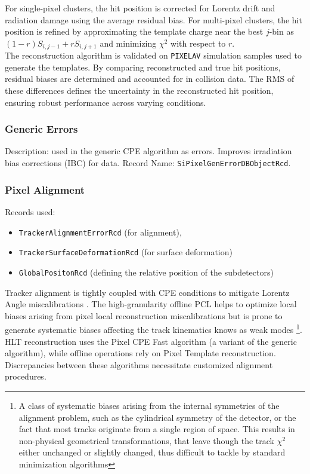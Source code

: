 For single-pixel clusters, the hit position is corrected for Lorentz drift and radiation damage using the average residual bias. For multi-pixel clusters, the hit position is refined by approximating the template charge near the best \(j\)-bin as \((1-r)S_{i,j-1} + rS_{i,j+1}\) and minimizing \(\chi^2\) with respect to \(r\).\\
The reconstruction algorithm is validated on \texttt{PIXELAV} simulation \cite{Swartz:687440} samples used to generate the templates. By comparing reconstructed and true hit positions, residual biases are determined and accounted for in collision data. The RMS of these differences defines the uncertainty in the reconstructed hit position, ensuring robust performance across varying conditions.

\subsubsection{Generic Errors}

Description: used in the generic CPE algorithm as errors. Improves irradiation bias corrections (IBC) for data.
Record Name:  \texttt{SiPixelGenErrorDBObjectRcd}.

\subsubsection{Pixel Alignment}
Records used: 
\begin{itemize}
\item \texttt{TrackerAlignmentErrorRcd} (for alignment), 
\item \texttt{TrackerSurfaceDeformationRcd} (for surface deformation)  \item \texttt{GlobalPositonRcd} (defining the relative position of the subdetectors) 
\end{itemize}

Tracker alignment is tightly coupled with CPE conditions to mitigate Lorentz Angle miscalibrations \cite{CMS:2022ali}. The high-granularity offline PCL helps to optimize local biases arising from pixel local reconstruction miscalibrations but is prone to generate systematic biases affecting the track kinematics knows as weak modes \footnote{A class of systematic biases arising from the internal symmetries of the alignment problem, such as the cylindrical symmetry of the detector, or the fact that most tracks originate from a single region of space. This results in non-physical geometrical transformations, that leave though the track $\chi^{2}$ either unchanged or slightly changed, thus difficult to tackle by standard minimization algorithms}.
HLT reconstruction uses the Pixel CPE Fast algorithm (a variant of the generic algorithm), while offline operations rely on Pixel Template reconstruction. Discrepancies between these algorithms necessitate customized alignment procedures.

